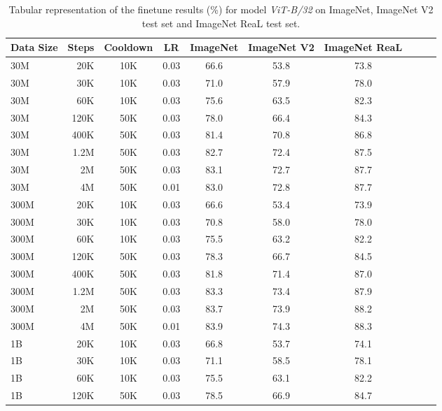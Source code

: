 \begin{table}[h]
  \setlength{\tabcolsep}{5pt}
  \setlength{\extrarowheight}{5pt}
  \renewcommand{\arraystretch}{0.75}
  \centering
  \caption{Tabular representation of the finetune results (\%) for model \emph{ViT-B/32} on ImageNet, ImageNet V2 test set and ImageNet ReaL test set.}\label{tbl:b_32_ft}
  \begin{tabulary}{1.0\textwidth}{l r c c c c c c c c}
    \toprule[1pt]
    \bf{Data Size} & \bf{Steps} & \bf{Cooldown} & \bf{LR} & \bf{ImageNet} & \bf{ImageNet V2} & \bf{ImageNet ReaL} \\
    \midrule
30M   & 20K   & 10K   & 0.03 & 66.6 & 53.8 & 73.8 \\
30M   & 30K   & 10K   & 0.03 & 71.0 & 57.9 & 78.0 \\
30M   & 60K   & 10K   & 0.03 & 75.6 & 63.5 & 82.3 \\
30M   & 120K  & 50K   & 0.03 & 78.0 & 66.4 & 84.3 \\
30M   & 400K  & 50K   & 0.03 & 81.4 & 70.8 & 86.8 \\
30M   & 1.2M  & 50K   & 0.03 & 82.7 & 72.4 & 87.5 \\
30M   & 2M    & 50K   & 0.03 & 83.1 & 72.7 & 87.7 \\
30M   & 4M    & 50K   & 0.01 & 83.0 & 72.8 & 87.7 \\
\midrule[0.25pt]
300M  & 20K   & 10K   & 0.03 & 66.6 & 53.4 & 73.9 \\
300M  & 30K   & 10K   & 0.03 & 70.8 & 58.0 & 78.0 \\
300M  & 60K   & 10K   & 0.03 & 75.5 & 63.2 & 82.2 \\
300M  & 120K  & 50K   & 0.03 & 78.3 & 66.7 & 84.5 \\
300M  & 400K  & 50K   & 0.03 & 81.8 & 71.4 & 87.0 \\
300M  & 1.2M  & 50K   & 0.03 & 83.3 & 73.4 & 87.9 \\
300M  & 2M    & 50K   & 0.03 & 83.7 & 73.9 & 88.2 \\
300M  & 4M    & 50K   & 0.01 & 83.9 & 74.3 & 88.3 \\
\midrule[0.25pt]
1B    & 20K   & 10K   & 0.03 & 66.8 & 53.7 & 74.1 \\
1B    & 30K   & 10K   & 0.03 & 71.1 & 58.5 & 78.1 \\
1B    & 60K   & 10K   & 0.03 & 75.5 & 63.1 & 82.2 \\
1B    & 120K  & 50K   & 0.03 & 78.5 & 66.9 & 84.7 \\

\end{tabulary}
\end{table}
